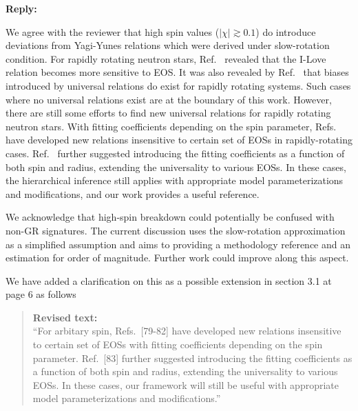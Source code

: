 \documentclass[11pt]{article}
\newenvironment{authorresponse}{
    \noindent \textbf{Reply:} \normalfont
}{
    \par\vspace{1.5em}
}
\newenvironment{revisedtext}{
    \begin{quote}
    \color{revcolor} \small \textbf{Revised text:} \\
}{
    \end{quote}
}
\begin{document}
\begin{authorresponse}
    We agree with the reviewer that high spin values ($ |\chi| \gtrsim 0.1$) do
    introduce deviations from Yagi-Yunes relations which were derived under
    slow-rotation condition. For rapidly rotating neutron stars,
    Ref.~\cite{Pani:2015nua} revealed that the I-Love relation becomes more
    sensitive to EOS. It was also revealed by Ref.~\cite{Williams:2026jqv} 
    that biases introduced by universal relations do exist for rapidly rotating systems. Such cases where no universal relations exist are at the
    boundary of this work. However, there are still some efforts to find new
    universal relations for rapidly rotating neutron stars. With fitting
    coefficients depending on the spin parameter,
    Refs.~\cite{Doneva:2013rha, Pappas:2013naa, Yagi:2014bxa, Doneva:2014faa} have developed new
    relations insensitive to certain set of EOSs in rapidly-rotating cases.
    Ref.~\cite{Chakrabarti:2013tca} further suggested introducing the fitting
    coefficients as a function of both spin and radius, extending the
    universality to various EOSs. In these cases, the hierarchical inference
    still applies with appropriate model parameterizations and modifications, and our work provides a useful reference.
    
    We acknowledge that high-spin breakdown could potentially be confused with
    non-GR signatures. The current discussion uses the slow-rotation
    approximation as a simplified assumption and aims to providing a methodology
    reference and an estimation for order of magnitude. Further work could improve along this aspect.
    
    We have added a clarification on this as a possible extension in section 3.1 at page 6 as follows
    \begin{revisedtext}
        ``For arbitary spin, Refs.~[79-82] have developed new
        relations insensitive to certain set of EOSs with fitting coefficients depending on the spin parameter. 
        Ref.~[83] further suggested introducing the fitting
        coefficients as a function of both spin and radius, extending the
        universality to various EOSs. In these cases, our framework
        will still be useful with appropriate model parameterizations and modifications.''
    \end{revisedtext}
    

\end{authorresponse}
\end{document}
